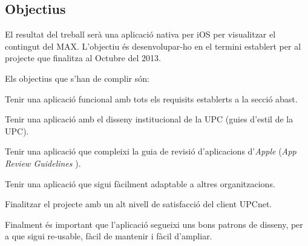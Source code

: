 \subsection{Objectius}

El resultat del treball serà una aplicació nativa per iOS per visualitzar el contingut del MAX. L'objectiu és desenvolupar-ho en el termini establert per al projecte que finalitza al Octubre del 2013.

Els objectius que s'han de complir són:

\begin{compactitem}
    \item Tenir una aplicació funcional amb tots els requisits establerts a la secció abast.
    \item Tenir una aplicació amb el disseny institucional de la UPC (guies d'estil de la UPC\cite{guia_estil_upc}).
    \item Tenir una aplicació que compleixi la guia de revisió d'aplicacions d'\textit{Apple} (\textit{App Review Guidelines} \cite{apple_app_review_guideliness}).
    \item Tenir una aplicació que sigui fàcilment adaptable a altres organitzacions.
    \item Finalitzar el projecte amb un alt nivell de satisfacció del client UPCnet. 
\end{compactitem}

Finalment és important que l'aplicació segueixi uns bons patrons de disseny, per a que sigui re-usable, fàcil de mantenir i fàcil d'ampliar.
